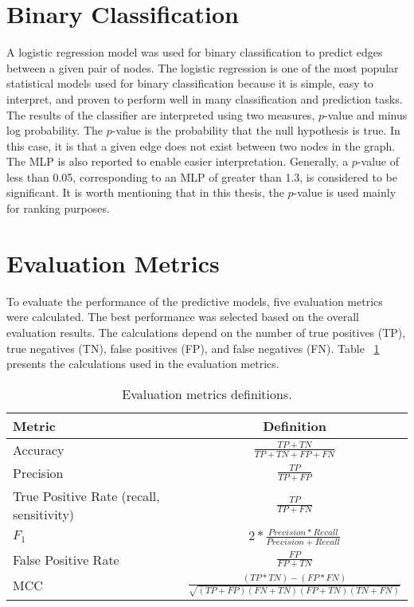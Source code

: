 \section{Binary Classification}

A logistic regression model was used for binary classification to predict edges between a given pair of nodes. The logistic regression is one of the most popular statistical models used for binary classification because it is simple, easy to interpret, and proven to perform well in many classification and prediction tasks.
The results of the classifier are interpreted using two measures, $p$-value and minus log probability. The $p$-value is the probability that the null hypothesis is true. In this case, it is that a given edge does not exist between two nodes in the graph. The \ac{MLP} is also reported to enable easier interpretation. Generally, a $p$-value of less than 0.05, corresponding to an \ac{MLP} of greater than 1.3,  is considered to be significant. It is worth mentioning that in this thesis, the $p$-value is used mainly for ranking purposes.

\section{Evaluation Metrics}
\label{evaluation_section}
To evaluate the performance of the predictive models, five evaluation metrics were calculated. The best performance was selected based on the overall evaluation results. The calculations depend on the number of true positives (TP), true negatives (TN), false positives (FP), and false negatives (FN). Table ~\ref{tab:evaluation} presents the calculations used in the evaluation metrics.

\begin{table}[h]
    \centering
    \begin{tabular}{ |l|c| } 
        \hline
        \textbf{Metric} & \textbf{Definition} \\
        \hline
        Accuracy & $\frac{TP + TN}{TP + TN + FP + FN}$ \\ 
        \hline
        Precision & $\frac{TP}{TP + FP}$ \\
        \hline
        True Positive Rate (recall, sensitivity) & $\frac{TP}{TP + FN}$ \\ 
        \hline
        $F_{1}$ & $2 * \frac{Precision * Recall}{Precision + Recall}$ \\
        \hline
        False Positive Rate & $\frac{FP}{FP + TN}$ \\
        \hline
        \ac{MCC} & $\frac{(TP*TN)-(FP*FN)}{\sqrt{(TP + FP)(FN + TN)(FP + TN)(TN + FN)}}$ \\
        \hline
    \end{tabular}
    \caption{Evaluation metrics definitions.}
    \label{tab:evaluation}
\end{table}

